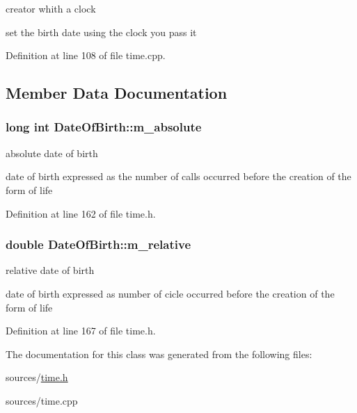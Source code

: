creator whith a clock 

set the birth date using the clock you pass it 

Definition at line 108 of file time.cpp.



\subsection{Member Data Documentation}
\hypertarget{classDateOfBirth_a3f2be0fbfb187a421301d50c768784ba}{
\subsubsection[{m\_\-absolute}]{\setlength{\rightskip}{0pt plus 5cm}long int {\bf DateOfBirth::m\_\-absolute}}}
\label{classDateOfBirth_a3f2be0fbfb187a421301d50c768784ba}


absolute date of birth 

date of birth expressed as the number of calls occurred before the creation of the form of life 

Definition at line 162 of file time.h.

\hypertarget{classDateOfBirth_a4e0f255eaf334e4e35a49aceee5df28d}{
\subsubsection[{m\_\-relative}]{\setlength{\rightskip}{0pt plus 5cm}double {\bf DateOfBirth::m\_\-relative}}}
\label{classDateOfBirth_a4e0f255eaf334e4e35a49aceee5df28d}


relative date of birth 

date of birth expressed as number of cicle occurred before the creation of the form of life 

Definition at line 167 of file time.h.



The documentation for this class was generated from the following files:\begin{DoxyCompactItemize}
\item 
sources/\hyperlink{time_8h}{time.h}\item 
sources/time.cpp\end{DoxyCompactItemize}
